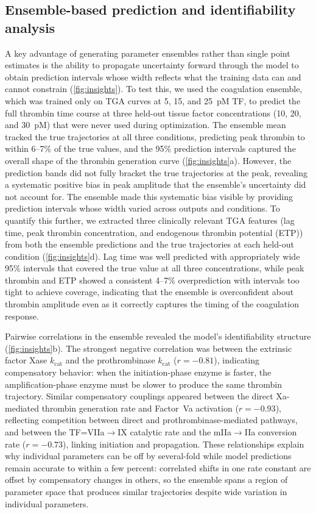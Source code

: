 \documentclass[preprint,review,12pt]{elsarticle}
\begin{document}
\subsection{Ensemble-based prediction and identifiability analysis}\label{sec:ensemble_insights}
A key advantage of generating parameter ensembles rather than single point estimates is the ability to propagate uncertainty forward through the model to obtain prediction intervals whose width reflects what the training data can and cannot constrain (\cref{fig:insights}). To test this, we used the coagulation ensemble, which was trained only on TGA curves at 5, 15, and 25~pM TF, to predict the full thrombin time course at three held-out tissue factor concentrations (10, 20, and 30~pM) that were never used during optimization. The ensemble mean tracked the true trajectories at all three conditions, predicting peak thrombin to within 6--7\% of the true values, and the 95\% prediction intervals captured the overall shape of the thrombin generation curve (\cref{fig:insights}a). However, the prediction bands did not fully bracket the true trajectories at the peak, revealing a systematic positive bias in peak amplitude that the ensemble's uncertainty did not account for. The ensemble made this systematic bias visible by providing prediction intervals whose width varied across outputs and conditions. To quantify this further, we extracted three clinically relevant TGA features (lag time, peak thrombin concentration, and endogenous thrombin potential (ETP)) from both the ensemble predictions and the true trajectories at each held-out condition (\cref{fig:insights}d). Lag time was well predicted with appropriately wide 95\% intervals that covered the true value at all three concentrations, while peak thrombin and ETP showed a consistent 4--7\% overprediction with intervals too tight to achieve coverage, indicating that the ensemble is overconfident about thrombin amplitude even as it correctly captures the timing of the coagulation response.

Pairwise correlations in the ensemble revealed the model's identifiability structure (\cref{fig:insights}b). The strongest negative correlation was between the extrinsic factor Xase $k_{\text{cat}}$ and the prothrombinase $k_{\text{cat}}$ ($r = -0.81$), indicating compensatory behavior: when the initiation-phase enzyme is faster, the amplification-phase enzyme must be slower to produce the same thrombin trajectory. Similar compensatory couplings appeared between the direct Xa-mediated thrombin generation rate and Factor~Va activation ($r = -0.93$), reflecting competition between direct and prothrombinase-mediated pathways, and between the TF=VIIa$\to$IX catalytic rate and the mIIa$\to$IIa conversion rate ($r = -0.73$), linking initiation and propagation. These relationships explain why individual parameters can be off by several-fold while model predictions remain accurate to within a few percent: correlated shifts in one rate constant are offset by compensatory changes in others, so the ensemble spans a region of parameter space that produces similar trajectories despite wide variation in individual parameters.
\end{document}
